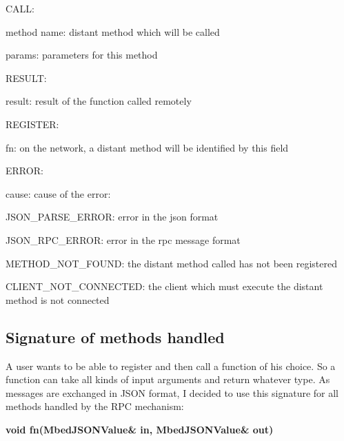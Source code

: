 \documentclass[pdftex,10pt,a4paper]{report}
\newenvironment{packed_item}{
\begin{itemize}
  \setlength{\itemsep}{1pt}
  \setlength{\parskip}{0pt}
  \setlength{\parsep}{0pt}
}{\end{itemize}}
\begin{document}
\begin{packed_item}
	\item CALL:
		\begin{packed_item}
			\item method name: distant method which will be called
			\item params: parameters for this method
		\end{packed_item}
	\item RESULT:
		\begin{packed_item}
			\item result: result of the function called remotely
		\end{packed_item}
	\item REGISTER:
		\begin{packed_item}
			\item fn: on the network, a distant method will be identified by this field
		\end{packed_item}
	\item ERROR:
		\begin{packed_item}
			\item cause: cause of the error:
			\begin{packed_item}
				\item JSON\_PARSE\_ERROR: error in the json format
				\item JSON\_RPC\_ERROR: error in the rpc message format
				\item METHOD\_NOT\_FOUND: the distant method called has not been registered
				\item CLIENT\_NOT\_CONNECTED: the client which must execute the distant method is not connected
			\end{packed_item}
		\end{packed_item}
\end{packed_item}

\subsection{Signature of methods handled}
A user wants to be able to register and then call a function of his choice. So a function can take all kinds of input arguments and return whatever type.
As messages are exchanged in JSON format, I decided to use this signature for all methods handled by the RPC mechanism:

\begin{center}
\textbf{void fn(MbedJSONValue\& in, MbedJSONValue\& out)}
\end{center}
\end{document}
